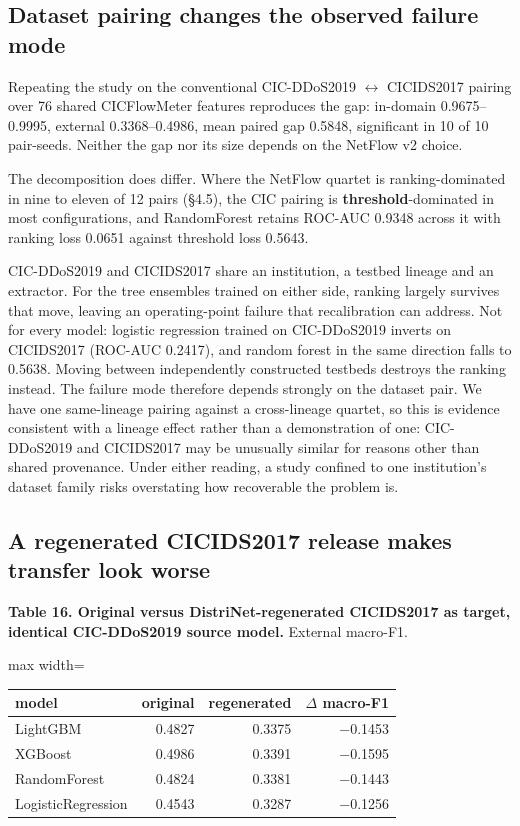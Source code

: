 \documentclass[preprint,12pt]{elsarticle}
\begin{document}
\subsection{Dataset pairing changes the observed failure mode}

Repeating the study on the conventional CIC-DDoS2019 \ensuremath{\leftrightarrow} CICIDS2017 pairing over 76 shared CICFlowMeter features reproduces the gap: in-domain 0.9675--0.9995, external 0.3368--0.4986, mean paired gap 0.5848, significant in 10 of 10 pair-seeds. Neither the gap nor its size depends on the NetFlow v2 choice.

The decomposition does differ. Where the NetFlow quartet is ranking-dominated in nine to eleven of 12 pairs (\S{}4.5), the CIC pairing is \textbf{threshold}-dominated in most configurations, and RandomForest retains ROC-AUC 0.9348 across it with ranking loss 0.0651 against threshold loss 0.5643.

CIC-DDoS2019 and CICIDS2017 share an institution, a testbed lineage and an extractor. For the tree ensembles trained on either side, ranking largely survives that move, leaving an operating-point failure that recalibration can address. Not for every model: logistic regression trained on CIC-DDoS2019 inverts on CICIDS2017 (ROC-AUC 0.2417), and random forest in the same direction falls to 0.5638. Moving between independently constructed testbeds destroys the ranking instead. The failure mode therefore depends strongly on the dataset pair. We have one same-lineage pairing against a cross-lineage quartet, so this is evidence consistent with a lineage effect rather than a demonstration of one: CIC-DDoS2019 and CICIDS2017 may be unusually similar for reasons other than shared provenance. Under either reading, a study confined to one institution's dataset family risks overstating how recoverable the problem is.

\subsection{A regenerated CICIDS2017 release makes transfer look worse}

\textbf{Table 16. Original versus DistriNet-regenerated CICIDS2017 as target, identical CIC-DDoS2019 source model.} External macro-F1.

\begin{table}[htbp]\centering\scriptsize
\begin{adjustbox}{max width=\textwidth}\begin{tabular}{lrrr}
\toprule
model & original & regenerated & $\Delta$ macro-F1 \\
\midrule
LightGBM & 0.4827 & 0.3375 & $-$0.1453 \\
XGBoost & 0.4986 & 0.3391 & $-$0.1595 \\
RandomForest & 0.4824 & 0.3381 & $-$0.1443 \\
LogisticRegression & 0.4543 & 0.3287 & $-$0.1256 \\
\bottomrule
\end{tabular}\end{adjustbox}
\end{table}
\end{document}
